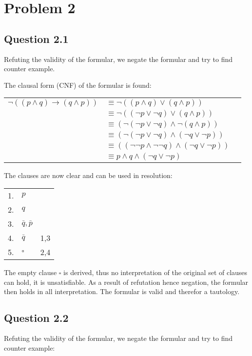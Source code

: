 \newpage
\section*{Problem 2}

\subsection*{Question 2.1}
Refuting the validity of the formular, we negate the formular and try to find counter example.

The clausal form (CNF) of the formular is found:

\begin{center}
    \begin{tabular}{ clr }
        $\neg ((p \land q) \to (q \land p))$ & $\equiv \neg ((p \land q) \lor (q \land p))$ \\ 
        & $\equiv \neg ((\neg p \lor \neg q) \lor (q \land p))$ \\ 
        & $\equiv (\neg (\neg p \lor \neg q) \land \neg (q \land p))$ \\
        & $\equiv (\neg (\neg p \lor \neg q) \land (\neg q \lor \neg p))$ \\
        & $\equiv ( (\neg \neg p \land \neg \neg q) \land (\neg q \lor \neg p))$ \\
        & $\equiv p \land q \land (\neg q \lor \neg p)$
    \end{tabular}
\end{center}

The clauses are now clear and can be used in resolution:
\begin{center}
    \begin{tabular}{ clr }
        1. & $p$ & \\
        2. & $q$ & \\
        3. & $\bar{q}, \bar{p}$ & \\
        4. & $\bar{q}$ & 1,3 \\
        5. & $\square$ & 2,4 \\
    \end{tabular}
\end{center}

The empty clause $\square$ is derived, thus no interpretation of the original set of clauses can hold, it is unsatisfiable. 
As a result of refutation hence negation, the formular then holds in all interpretation. The formular is valid and therefor a tautology.

\subsection*{Question 2.2}
Refuting the validity of the formular, we negate the formular and try to find counter example:

